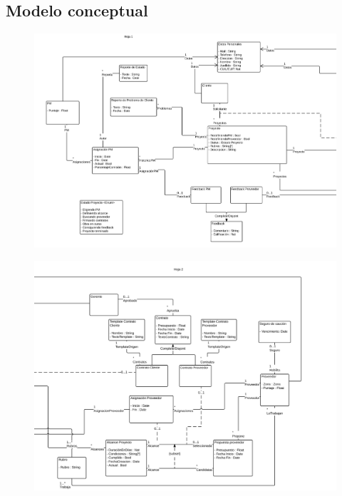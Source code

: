 \subsection{Modelo conceptual}

\begin{figure}[H]
\includegraphics[width=\linewidth]{diag/viejos/conc1.png}
\end{figure}
\begin{figure}[H]
\includegraphics[width=\linewidth]{diag/viejos/conc2.png}
\end{figure}

